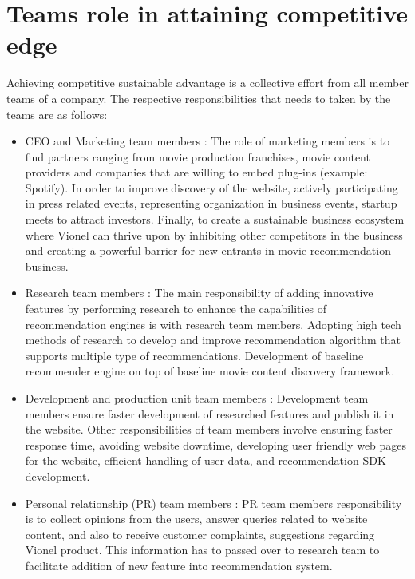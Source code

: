 \section{Teams role in attaining competitive edge}
    Achieving competitive sustainable advantage is a collective effort from all member teams of a company. The respective responsibilities that needs to taken by the teams are as follows:
    \begin{itemize}

    \item CEO and Marketing team members : 
    The role of marketing members is to find partners ranging from movie production franchises, movie content providers and companies that are willing to embed plug-ins (example: Spotify). In order to improve discovery of the website, actively participating in press related events, representing organization in business events, startup meets to attract investors. Finally, to create a sustainable business ecosystem where Vionel can thrive upon by inhibiting other competitors in the business and creating a powerful barrier for new entrants in movie recommendation business.  
    
    \item Research team members : 
    The main responsibility of adding innovative features by performing research to enhance the capabilities of recommendation engines is with research team members. Adopting high tech methods of research to develop and improve recommendation algorithm that supports multiple type of recommendations. Development of baseline recommender engine on top of baseline movie content discovery framework.
    
    \item Development and production unit team members : 
    Development team members ensure faster development of researched features and publish it in the website. Other responsibilities of team members involve ensuring faster response time, avoiding website downtime, developing user friendly web pages for the website, efficient handling of user data, and recommendation SDK development. 

    \item Personal relationship (PR) team members : 
    PR team members responsibility is to collect opinions from the users, answer queries related to website content, and also to receive customer complaints, suggestions regarding Vionel product. This information has to passed over to research team to facilitate addition of new feature into recommendation system.

    \end{itemize}  
       
